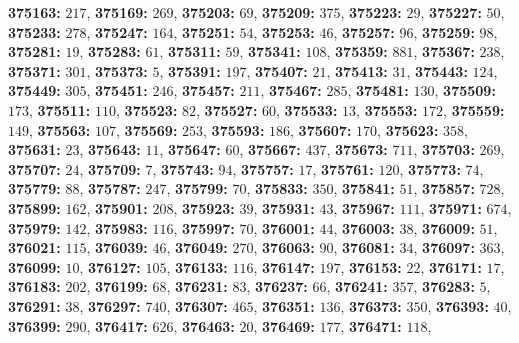\textsf{\bfseries 375163:} $217$, \textsf{\bfseries 375169:} $269$, \textsf{\bfseries 375203:} $69$, \textsf{\bfseries 375209:} $375$, \textsf{\bfseries 375223:} $29$, \textsf{\bfseries 375227:} $50$, \textsf{\bfseries 375233:} $278$, \textsf{\bfseries 375247:} $164$, \textsf{\bfseries 375251:} $54$, \textsf{\bfseries 375253:} $46$, \textsf{\bfseries 375257:} $96$, \textsf{\bfseries 375259:} $98$, \textsf{\bfseries 375281:} $19$, \textsf{\bfseries 375283:} $61$, \textsf{\bfseries 375311:} $59$, \textsf{\bfseries 375341:} $108$, \textsf{\bfseries 375359:} $881$, \textsf{\bfseries 375367:} $238$, \textsf{\bfseries 375371:} $301$, \textsf{\bfseries 375373:} $5$, \textsf{\bfseries 375391:} $197$, \textsf{\bfseries 375407:} $21$, \textsf{\bfseries 375413:} $31$, \textsf{\bfseries 375443:} $124$, \textsf{\bfseries 375449:} $305$, \textsf{\bfseries 375451:} $246$, \textsf{\bfseries 375457:} $211$, \textsf{\bfseries 375467:} $285$, \textsf{\bfseries 375481:} $130$, \textsf{\bfseries 375509:} $173$, \textsf{\bfseries 375511:} $110$, \textsf{\bfseries 375523:} $82$, \textsf{\bfseries 375527:} $60$, \textsf{\bfseries 375533:} $13$, \textsf{\bfseries 375553:} $172$, \textsf{\bfseries 375559:} $149$, \textsf{\bfseries 375563:} $107$, \textsf{\bfseries 375569:} $253$, \textsf{\bfseries 375593:} $186$, \textsf{\bfseries 375607:} $170$, \textsf{\bfseries 375623:} $358$, \textsf{\bfseries 375631:} $23$, \textsf{\bfseries 375643:} $11$, \textsf{\bfseries 375647:} $60$, \textsf{\bfseries 375667:} $437$, \textsf{\bfseries 375673:} $711$, \textsf{\bfseries 375703:} $269$, \textsf{\bfseries 375707:} $24$, \textsf{\bfseries 375709:} $7$, \textsf{\bfseries 375743:} $94$, \textsf{\bfseries 375757:} $17$, \textsf{\bfseries 375761:} $120$, \textsf{\bfseries 375773:} $74$, \textsf{\bfseries 375779:} $88$, \textsf{\bfseries 375787:} $247$, \textsf{\bfseries 375799:} $70$, \textsf{\bfseries 375833:} $350$, \textsf{\bfseries 375841:} $51$, \textsf{\bfseries 375857:} $728$, \textsf{\bfseries 375899:} $162$, \textsf{\bfseries 375901:} $208$, \textsf{\bfseries 375923:} $39$, \textsf{\bfseries 375931:} $43$, \textsf{\bfseries 375967:} $111$, \textsf{\bfseries 375971:} $674$, \textsf{\bfseries 375979:} $142$, \textsf{\bfseries 375983:} $116$, \textsf{\bfseries 375997:} $70$, \textsf{\bfseries 376001:} $44$, \textsf{\bfseries 376003:} $38$, \textsf{\bfseries 376009:} $51$, \textsf{\bfseries 376021:} $115$, \textsf{\bfseries 376039:} $46$, \textsf{\bfseries 376049:} $270$, \textsf{\bfseries 376063:} $90$, \textsf{\bfseries 376081:} $34$, \textsf{\bfseries 376097:} $363$, \textsf{\bfseries 376099:} $10$, \textsf{\bfseries 376127:} $105$, \textsf{\bfseries 376133:} $116$, \textsf{\bfseries 376147:} $197$, \textsf{\bfseries 376153:} $22$, \textsf{\bfseries 376171:} $17$, \textsf{\bfseries 376183:} $202$, \textsf{\bfseries 376199:} $68$, \textsf{\bfseries 376231:} $83$, \textsf{\bfseries 376237:} $66$, \textsf{\bfseries 376241:} $357$, \textsf{\bfseries 376283:} $5$, \textsf{\bfseries 376291:} $38$, \textsf{\bfseries 376297:} $740$, \textsf{\bfseries 376307:} $465$, \textsf{\bfseries 376351:} $136$, \textsf{\bfseries 376373:} $350$, \textsf{\bfseries 376393:} $40$, \textsf{\bfseries 376399:} $290$, \textsf{\bfseries 376417:} $626$, \textsf{\bfseries 376463:} $20$, \textsf{\bfseries 376469:} $177$, \textsf{\bfseries 376471:} $118$, 
